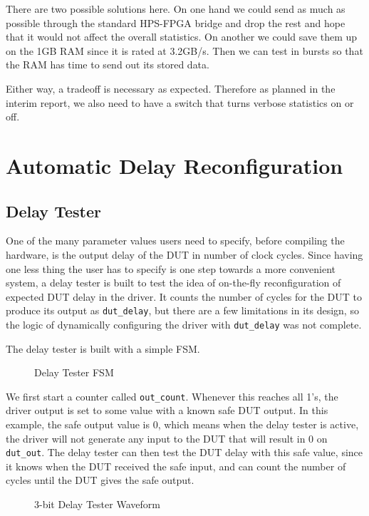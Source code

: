 There are two possible solutions here.
On one hand we could send as much as possible through the standard HPS-FPGA bridge and drop the rest and hope that it would not affect the overall statistics.
On another we could save them up on the 1GB RAM since it is rated at 3.2GB/s.
Then we can test in bursts so that the RAM has time to send out its stored data.

Either way, a tradeoff is necessary as expected.
Therefore as planned in the interim report, we also need to have a switch that turns verbose statistics on or off.

\section{Automatic Delay Reconfiguration}
\subsection{Delay Tester}
One of the many parameter values users need to specify, before compiling the hardware, is the output delay of the DUT in number of clock cycles.
Since having one less thing the user has to specify is one step towards a more convenient system, a delay tester is built to test the idea of on-the-fly reconfiguration of expected DUT delay in the driver.
It counts the number of cycles for the DUT to produce its output as \texttt{dut\_delay}, but there are a few limitations in its design, so the logic of dynamically configuring the driver with \texttt{dut\_delay} was not complete.

The delay tester is built with a simple FSM.

\begin{figure}[H]
  \centering
  
  \caption{Delay Tester FSM}
  \label{DelayTesterFSM}
\end{figure}

We first start a counter called \texttt{out\_count}.
Whenever this reaches all 1's, the driver output is set to some value with a known safe DUT output.
In this example, the safe output value is 0, which means when the delay tester is active, the driver will not generate any input to the DUT that will result in 0 on \texttt{dut\_out}.
The delay tester can then test the DUT delay with this safe value, since it knows when the DUT received the safe input, and can count the number of cycles until the DUT gives the safe output.

\begin{figure}[H]
  \centering
  
  \caption{3-bit Delay Tester Waveform}
  \label{DelayTesterWF}
\end{figure}

